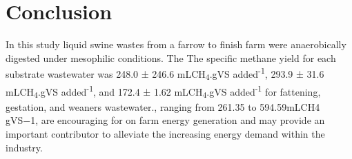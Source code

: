 \section{Conclusion}
In this study liquid swine wastes from a farrow to finish farm were anaerobically digested under mesophilic conditions. The The specific methane yield for each substrate wastewater was 248.0 ± 246.6 mLCH\textsubscript{4}.gVS added\textsuperscript{-1}, 293.9 ± 31.6 mLCH\textsubscript{4}.gVS added\textsuperscript{-1}, and 172.4 ± 1.62 mLCH\textsubscript{4}.gVS added\textsuperscript{-1} for fattening, gestation, and weaners wastewater., ranging from 261.35 to 594.59mLCH4 gVS−1, are encouraging for on farm energy generation and may provide an important contributor to alleviate the increasing energy demand within the industry.